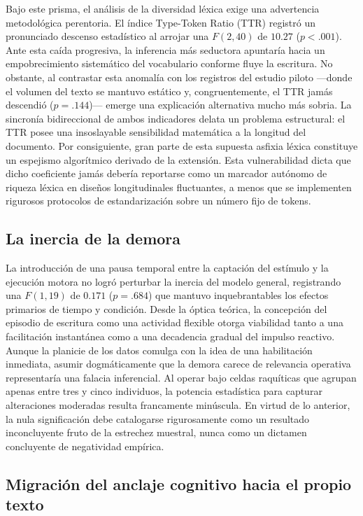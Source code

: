 \documentclass[12pt]{article}
\begin{document}
	Bajo este prisma, el análisis de la diversidad léxica exige una advertencia metodológica perentoria. El índice Type-Token Ratio (TTR) registró un pronunciado descenso estadístico al arrojar una $F(2,40)$ de $10.27$ ($p < .001$). Ante esta caída progresiva, la inferencia más seductora apuntaría hacia un empobrecimiento sistemático del vocabulario conforme fluye la escritura. No obstante, al contrastar esta anomalía con los registros del estudio piloto —donde el volumen del texto se mantuvo estático y, congruentemente, el TTR jamás descendió ($p = .144$)— emerge una explicación alternativa mucho más sobria. La sincronía bidireccional de ambos indicadores delata un problema estructural: el TTR posee una insoslayable sensibilidad matemática a la longitud del documento. Por consiguiente, gran parte de esta supuesta asfixia léxica constituye un espejismo algorítmico derivado de la extensión. Esta vulnerabilidad dicta que dicho coeficiente jamás debería reportarse como un marcador autónomo de riqueza léxica en diseños longitudinales fluctuantes, a menos que se implementen rigurosos protocolos de estandarización sobre un número fijo de tokens.
	
	\subsection{La inercia de la demora}
	
	La introducción de una pausa temporal entre la captación del estímulo y la ejecución motora no logró perturbar la inercia del modelo general, registrando una $F(1,19)$ de $0.171$ ($p = .684$) que mantuvo inquebrantables los efectos primarios de tiempo y condición. Desde la óptica teórica, la concepción del episodio de escritura como una actividad flexible otorga viabilidad tanto a una facilitación instantánea como a una decadencia gradual del impulso reactivo. Aunque la planicie de los datos comulga con la idea de una habilitación inmediata, asumir dogmáticamente que la demora carece de relevancia operativa representaría una falacia inferencial. Al operar bajo celdas raquíticas que agrupan apenas entre tres y cinco individuos, la potencia estadística para capturar alteraciones moderadas resulta francamente minúscula. En virtud de lo anterior, la nula significación debe catalogarse rigurosamente como un resultado inconcluyente fruto de la estrechez muestral, nunca como un dictamen concluyente de negatividad empírica.
	
	\subsection{Migración del anclaje cognitivo hacia el propio texto}
	
\end{document}
